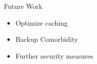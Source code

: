 \documentclass[11pt]{beamer}
\begin{document}
\begin{frame}{Future Work}
	\begin{itemize}
		\item Optimize caching
		\item Backup Comorbidity 
		\item Further security measures
	\end{itemize}
\end{frame}



%
\end{document}
